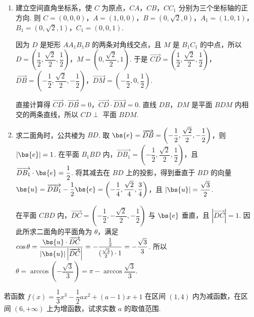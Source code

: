 \begin{solution}
\begin{enumerate}
\item
建立空间直角坐标系，使 \(C\) 为原点，\(CA\)，\(CB\)，\(CC_1\) 分别为三个坐标轴的正方向. 则 \(C=(0,0,0)\)，\(A=(1,0,0)\)，\(B=(0,\sqrt2,0)\)，\(A_1=(1,0,1)\)，\(B_1=(0,\sqrt2,1)\)，\(C_1=(0,0,1)\).

因为 \(D\) 是矩形 \(AA_1B_1B\) 的两条对角线交点，且 \(M\) 是 \(B_1C_1\) 的中点，所以 \(D=\left(\dfrac{1}{2},\dfrac{\sqrt2}{2},\dfrac{1}{2}\right)\)，\(M=\left(0,\dfrac{\sqrt2}{2},1\right)\). 于是 \(\overrightarrow{CD}=\left(\dfrac{1}{2},\dfrac{\sqrt2}{2},\dfrac{1}{2}\right)\)，\(\overrightarrow{DB}=\left(-\dfrac{1}{2},\dfrac{\sqrt2}{2},-\dfrac{1}{2}\right)\)，\(\overrightarrow{DM}=\left(-\dfrac{1}{2},0,\dfrac{1}{2}\right)\).

直接计算得 \(\overrightarrow{CD}\cdot\overrightarrow{DB}=0\)，\(\overrightarrow{CD}\cdot\overrightarrow{DM}=0\). 直线 \(DB\)，\(DM\) 是平面 \(BDM\) 内相交的两条直线，所以 \(CD\perp\) 平面 \(BDM\).

\item
求二面角时，公共棱为 \(BD\). 取 \(\bs{e}=\overrightarrow{DB}=\left(-\dfrac{1}{2},\dfrac{\sqrt2}{2},-\dfrac{1}{2}\right)\)，则 \(\left|\bs{e}\right|=1\). 在平面 \(B_1BD\) 内，\(\overrightarrow{DB_1}=\left(-\dfrac{1}{2},\dfrac{\sqrt2}{2},\dfrac{1}{2}\right)\)，且 \(\overrightarrow{DB_1}\cdot\bs{e}=\dfrac{1}{2}\). 将其减去在 \(BD\) 上的投影，得到垂直于 \(BD\) 的向量 \(\bs{u}=\overrightarrow{DB_1}-\dfrac{1}{2}\bs{e}=\left(-\dfrac{1}{4},\dfrac{\sqrt2}{4},\dfrac{3}{4}\right)\)，且 \(\left|\bs{u}\right|=\dfrac{\sqrt3}{2}\).

在平面 \(CBD\) 内，\(\overrightarrow{DC}=\left(-\dfrac{1}{2},-\dfrac{\sqrt2}{2},-\dfrac{1}{2}\right)\) 与 \(\bs{e}\) 垂直，且 \(\left|\overrightarrow{DC}\right|=1\). 因此所求二面角的平面角为 \(\theta\)，满足 \(\cos\theta=\dfrac{\bs{u}\cdot\overrightarrow{DC}}{\left|\bs{u}\right|\left|\overrightarrow{DC}\right|}=-\dfrac{\frac{1}{2}}{(\frac{\sqrt3}{2})\cdot1}=-\dfrac{\sqrt3}{3}\). 所以 \(\theta=\arccos\left(-\dfrac{\sqrt3}{3}\right)=\pi-\arccos\dfrac{\sqrt3}{3}\).
\end{enumerate}
\end{solution}

\begin{problem}
若函数 \(f(x)=\dfrac{1}{3}x^3-\dfrac{1}{2}ax^2+(a-1)x+1\) 在区间 \((1,4)\) 内为减函数，在区间 \((6,+\infty)\) 上为增函数，试求实数 \(a\) 的取值范围.
\end{problem}

